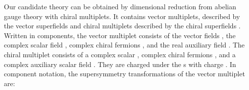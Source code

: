 \documentclass[a4paper,12pt]{article}
\begin{document}
Our candidate theory can be obtained by dimensional reduction from
\coordHE{} abelian gauge theory with chiral multiplets.  It contains \coordHE{}  \coordHE{} vector multiplets, described by the vector superfields \coordHE{} and \coordHE{} chiral multiplets described by the chiral
superfields \coordHE{}. Written in components, the vector
multiplet consists of the vector fields \coordHE{}, the
complex scalar field \coordHE{}, complex chiral fermions
\coordHE{}, and the real auxiliary field \coordHE{}.  The chiral
multiplet consists of a complex scalar \coordHE{}, complex chiral fermions
\coordHE{}, and a complex auxiliary scalar field \coordHE{}. They are
charged under the \coordHE{}s with charge \coordHE{}. In component notation, the
supersymmetry transformations of the vector multiplet are: 
\end{document}
